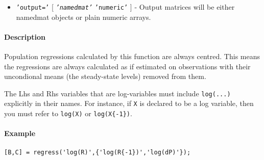 \begin{itemize}
\itemsep1pt\parskip0pt
\item
  \texttt{'output='} {[} \emph{\texttt{'namedmat'}} \textbar{}
  \texttt{'numeric'} {]} - Output matrices will be either namedmat
  objects or plain numeric arrays.
\end{itemize}

\paragraph{Description}\label{description}

Population regressions calculated by this function are always centred.
This means the regressions are always calculated as if estimated on
observations with their uncondional means (the steady-state levels)
removed from them.

The Lhs and Rhs variables that are log-variables must include
\texttt{log(...)} explicitly in their names. For instance, if \texttt{X}
is declared to be a log variable, then you must refer to \texttt{log(X)}
or \texttt{log(X\{-1\})}.

\paragraph{Example}\label{example}

\begin{verbatim}
[B,C] = regress('log(R)',{'log(R{-1})','log(dP)'});
\end{verbatim}


